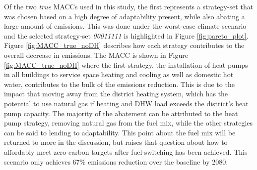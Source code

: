 \documentclass[twocolumn, a4paper,10pt]{article}
\begin{document}
Of the two \textit{true} MACCs used in this study, the first represents a strategy-set that was chosen based on a high degree of adaptability present, while also abating a large amount of emissions. This was done under the worst-case climate scenario and the selected strategy-set \textit{00011111} is highlighted in Figure \ref{fig:pareto_plot}. Figure \ref{fig:MACC_true_noDH} describes how each strategy contributes to the overall decrease in emissions. The MACC is shown in Figure \ref{fig:MACC_true_noDH} where the first strategy, the installation of heat pumps in all buildings to service space heating and cooling as well as domestic hot water, contributes to the bulk of the emissions reduction. This is due to the impact that moving away from the district heating system, which has the potential to use natural gas if heating and DHW load exceeds the district's heat pump capacity. The majority of the abatement can be attributed to the heat pump strategy, removing natural gas from the fuel mix, while the other strategies can be said to lending to adaptability. This point about the fuel mix will be returned to more in the discussion, but raises that question about how to affordably meet zero-carbon targets after fuel-switching has been achieved. This scenario only achieves 67\% emissions reduction over the baseline by 2080.


\end{document}
